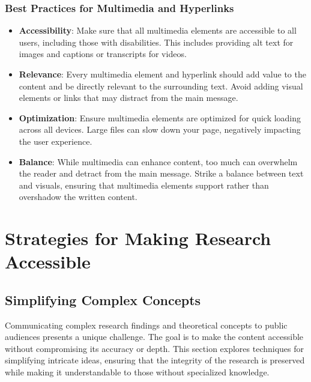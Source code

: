\documentclass[
]{book}
\begin{document}
\hypertarget{best-practices-for-multimedia-and-hyperlinks}{%
\subsubsection*{Best Practices for Multimedia and Hyperlinks}\label{best-practices-for-multimedia-and-hyperlinks}}

\begin{itemize}
\item
  \textbf{Accessibility}: Make sure that all multimedia elements are accessible to all users, including those with disabilities. This includes providing alt text for images and captions or transcripts for videos.
\item
  \textbf{Relevance}: Every multimedia element and hyperlink should add value to the content and be directly relevant to the surrounding text. Avoid adding visual elements or links that may distract from the main message.
\item
  \textbf{Optimization}: Ensure multimedia elements are optimized for quick loading across all devices. Large files can slow down your page, negatively impacting the user experience.
\item
  \textbf{Balance}: While multimedia can enhance content, too much can overwhelm the reader and detract from the main message. Strike a balance between text and visuals, ensuring that multimedia elements support rather than overshadow the written content.
\end{itemize}

\hypertarget{strategies-for-making-research-accessible}{%
\section*{Strategies for Making Research Accessible}\label{strategies-for-making-research-accessible}}

\hypertarget{simplifying-complex-concepts}{%
\subsection*{Simplifying Complex Concepts}\label{simplifying-complex-concepts}}

Communicating complex research findings and theoretical concepts to public audiences presents a unique challenge. The goal is to make the content accessible without compromising its accuracy or depth. This section explores techniques for simplifying intricate ideas, ensuring that the integrity of the research is preserved while making it understandable to those without specialized knowledge.
\end{document}
